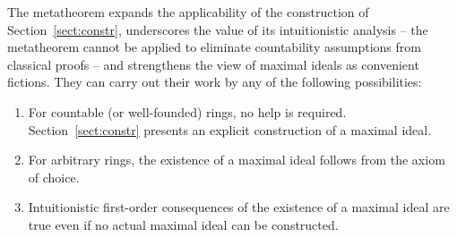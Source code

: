 \documentclass[envcountsect,envcountsame,runningheads]{llncs}
\renewcommand{\_}{\mathpunct{.}\,}
\begin{document}
The metatheorem expands the applicability of the construction of
Section~\ref{sect:constr}, underscores the value of its intuitionistic
analysis -- the metatheorem cannot be applied to eliminate countability assumptions from classical proofs --
and strengthens the
view of maximal ideals as convenient fictions. They can
carry out their work by any of the following possibilities:
\begin{enumerate}
\item For countable (or well-founded) rings, no help is required.
Section~\ref{sect:constr} presents an explicit construction of a maximal ideal.
\item For arbitrary rings, the existence of a maximal ideal follows from the
axiom of choice.
\item Intuitionistic first-order consequences of the existence of a maximal
ideal are true even if no actual maximal ideal can be constructed.
\end{enumerate}



\end{document}
